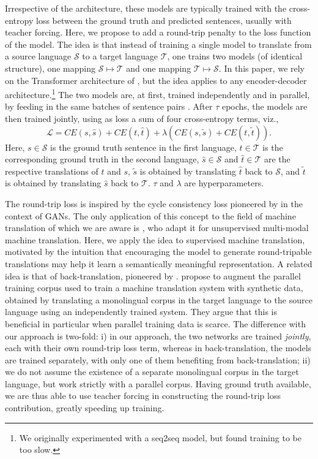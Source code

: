 \documentclass[10pt,a4paper]{article}
\begin{document}
Irrespective of the architecture, these models are typically trained with the cross-entropy loss between the ground truth and predicted sentences, usually with teacher forcing.
Here, we propose to add a round-trip penalty to the loss function of the model. The idea is that instead of training a single model to translate from a source language $\mathcal{S}$ to a target language $\mathcal{T}$, one trains two models (of identical structure), one mapping $\mathcal{S}\mapsto \mathcal{T}$ and one mapping $\mathcal{T}\mapsto \mathcal{S}$. In this paper, we rely on the Transformer architecture of \citet{transformer}, but the idea applies to any encoder-decoder architecture.\footnote{We originally experimented with a seq2seq model, but found training to be too slow.} The two models are, at first, trained independently and in parallel, by feeding in the same batches of sentence pairs . After $\tau$ epochs, the models are then trained jointly, using as loss a sum of four cross-entropy terms, viz.,
\begin{equation}
\mathcal{L} = CE(s, \hat{s}) + CE(t, \hat{t}) + \lambda \left( CE(s, \tilde{s}) + CE(t, \tilde{t})\right).
\label{eq:RTL}
\end{equation}
Here, $s\in\mathcal{S}$ is the ground truth sentence in the first language, $t\in\mathcal{T}$ is the corresponding ground truth in the second language, $\hat{s}\in\mathcal{S}$ and $\hat{t}\in\mathcal{T}$ are the respective translations of $t$ and $s$, $\tilde{s}$ is obtained by translating $\hat{t}$ back to $\mathcal{S}$, and $\tilde{t}$ is obtained by translating $\hat{s}$ back to $\mathcal{T}$. $\tau$ and $\lambda$ are hyperparameters.

The round-trip loss is inspired by the cycle consistency loss pioneered by \citet{CycleGAN2017} in the context of GANs. The only application of this concept to the field of machine translation of which we are aware is \citet{su:2018}, who adapt it for unsupervised multi-modal machine translation. Here, we apply the idea to supervised machine translation, motivated by the intuition that encouraging the model to generate round-tripable translations may help it learn a semantically meaningful representation. A related idea is that of back-translation, pioneered by \citet{backtrans}. \citeauthor{backtrans} propose to augment the parallel training corpus used to train a machine translation system with synthetic data, obtained by translating a monolingual corpus in the target language to the source language using an independently trained system. They argue that this is beneficial in particular when parallel training data is scarce. The difference with our approach is two-fold: i) in our approach, the two networks are trained \emph{jointly}, each with their own round-trip loss term, whereas in back-translation, the models are trained separately, with only one of them benefiting from back-translation; ii) we do not assume the existence of a separate monolingual corpus in the target language, but work strictly with a parallel corpus. Having ground truth available, we are thus able to use teacher forcing in constructing the round-trip loss contribution, greatly speeding up training.
\end{document}
